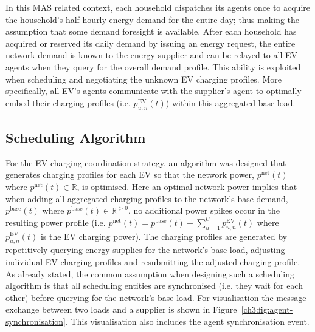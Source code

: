 In this MAS related context, each household dispatches its agents once to acquire the household's half-hourly energy demand for the entire day; thus making the assumption that some demand foresight is available.
After each household has acquired or reserved its daily demand by issuing an energy request, the entire network demand is known to the energy supplier and can be relayed to all EV agents when they query for the overall demand profile.
This ability is exploited when scheduling and negotiating the unknown EV charging profiles.
More specifically, all EV's agents communicate with the supplier's agent to optimally embed their charging profiles (i.e. $p^\text{EV}_{u,n}(t)$) within this aggregated base load.

\subsection{Scheduling Algorithm}
\label{ch3:subsec:scheduling-algorithm}

For the EV charging coordination strategy, an algorithm was designed that generates charging profiles for each EV so that the network power, $p^\text{net}(t)$ where $p^\text{net}(t) \in \mathbb{R}$, is optimised.
Here an optimal network power implies that when adding all aggregated charging profiles to the network's base demand, $p^\text{base}(t)$  where $p^\text{base}(t) \in \mathbb{R}^{>0}$, no additional power spikes occur in the resulting power profile (i.e. $p^\text{net}(t) = p^\text{base}(t) + \sum_{u=1}^U p^\text{EV}_{u,n}(t)$ where $p^\text{EV}_{u,n}(t)$ is the EV charging power).
The charging profiles are generated by repetitively querying energy supplies for the network's base load, adjusting individual EV charging profiles and resubmitting the adjusted charging profile.
As already stated, the common assumption when designing such a scheduling algorithm is that all scheduling entities are synchronised (i.e. they wait for each other) before querying for the network's base load.
For visualisation the message exchange between two loads and a supplier is shown in Figure~\ref{ch3:fig:agent-synchronisation}.
This visualisation also includes the agent synchronisation event.




